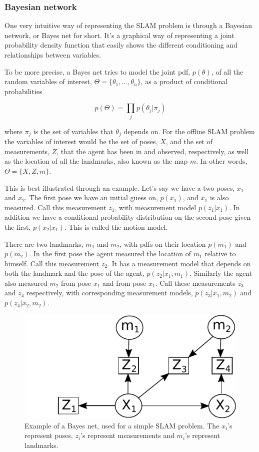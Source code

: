 \subsubsection{Bayesian network}

One very intuitive way of representing the SLAM problem is through a Bayesian network, or Bayes net for short. It's a graphical way of representing a joint probability density function that easily shows the different conditioning and relationships between variables. 

To be more precise, a Bayes net tries to model the joint pdf, $p(\theta)$, of all the random variables of interest, $\Theta = \{\theta_1, ..., \theta_n\}$, as a product of conditional probabilities

\begin{equation}
    p(\Theta) = \prod_j p(\theta_j|\pi_j)
\end{equation}

where $\pi_j$ is the set of variables that $\theta_j$ depends on. For the offline SLAM problem the variables of interest would be the set of poses, $X$, and the set of measurements, $Z$, that the agent has been in and observed, respectively, as well as the location of all the landmarks, also known as the map $m$. In other words, $\Theta = \{X,Z,m\}$. 

This is best illustrated through an example. Let's say we have a two poses, $x_1$ and $x_2$. The first pose we have an initial guess on, $p(x_1)$, and $x_1$ is also measured. Call this measurement $z_1$, with measurement model $p(z_1|x_1)$. In addition we have a conditional probability distribution on the second pose given the first, $p(x_2|x_1)$. This is called the motion model. 

There are two landmarks, $m_1$ and $m_2$, with pdfs on their location $p(m_1)$ and $p(m_2)$. In the first pose the agent measured the location of $m_1$ relative to himself. Call this measurement $z_2$. It has a measurement model that depends on both the landmark and the pose of the agent, $p(z_2|x_1,m_1)$. Similarly the agent also measured $m_2$ from pose $x_1$ and from pose $x_1$. Call these measurements $z_3$ and $z_4$ respectively, with corresponding measurement models, $p(z_3|x_1,m_2)$ and $p(z_4|x_2,m_2)$. 

\begin{figure}
    \centering
    \includegraphics[width=0.8\linewidth]{0_Images/3_Background/BayesNet.pdf}
    \caption[Example of a Bayes net.]
    {Example of a Bayes net, used for a simple SLAM problem. The $x_i$'s represent poses, $z_i$'s represent measurements and $m_i$'s represent landmarks.}
    \label{Fig:BayesNet}
\end{figure}

